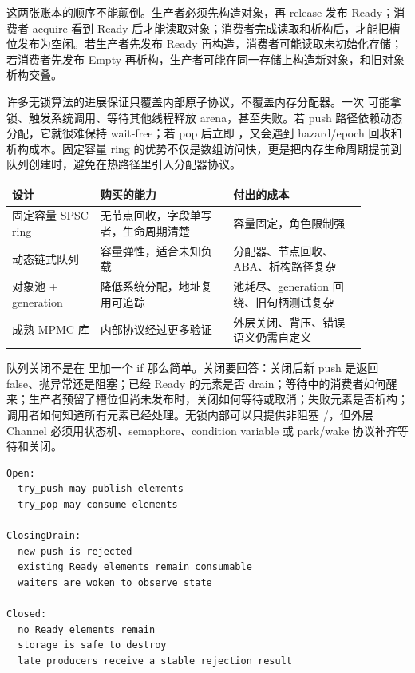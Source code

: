 这两张账本的顺序不能颠倒。生产者必须先构造对象，再 release 发布 Ready；消费者 acquire 看到 Ready 后才能读取对象；消费者完成读取和析构后，才能把槽位发布为空闲。若生产者先发布 Ready 再构造，消费者可能读取未初始化存储；若消费者先发布 Empty 再析构，生产者可能在同一存储上构造新对象，和旧对象析构交叠。

许多无锁算法的进展保证只覆盖内部原子协议，不覆盖内存分配器。一次  可能拿锁、触发系统调用、等待其他线程释放 arena，甚至失败。若 push 路径依赖动态分配，它就很难保持 wait-free；若 pop 后立即 ，又会遇到 hazard/epoch 回收和析构成本。固定容量 ring 的优势不仅是数组访问快，更是把内存生命周期提前到队列创建时，避免在热路径里引入分配器协议。

\begin{center}
\small
\begin{tabular}{@{}p{0.22\linewidth}p{0.33\linewidth}p{0.33\linewidth}@{}}
\toprule
设计 & 购买的能力 & 付出的成本 \\
\midrule
固定容量 SPSC ring & 无节点回收，字段单写者，生命周期清楚 & 容量固定，角色限制强 \\
动态链式队列 & 容量弹性，适合未知负载 & 分配器、节点回收、ABA、析构路径复杂 \\
对象池 + generation & 降低系统分配，地址复用可追踪 & 池耗尽、generation 回绕、旧句柄测试复杂 \\
成熟 MPMC 库 & 内部协议经过更多验证 & 外层关闭、背压、错误语义仍需自定义 \\
\bottomrule
\end{tabular}
\end{center}

队列关闭不是在  里加一个 if 那么简单。关闭要回答：关闭后新 push 是返回 false、抛异常还是阻塞；已经 Ready 的元素是否 drain；等待中的消费者如何醒来；生产者预留了槽位但尚未发布时，关闭如何等待或取消；失败元素是否析构；调用者如何知道所有元素已经处理。无锁内部可以只提供非阻塞 /，但外层 Channel 必须用状态机、semaphore、condition variable 或 park/wake 协议补齐等待和关闭。

\begin{lstlisting}[numbers=none,caption={Channel 外层关闭协议示意}]
Open:
  try_push may publish elements
  try_pop may consume elements

ClosingDrain:
  new push is rejected
  existing Ready elements remain consumable
  waiters are woken to observe state

Closed:
  no Ready elements remain
  storage is safe to destroy
  late producers receive a stable rejection result
\end{lstlisting}

